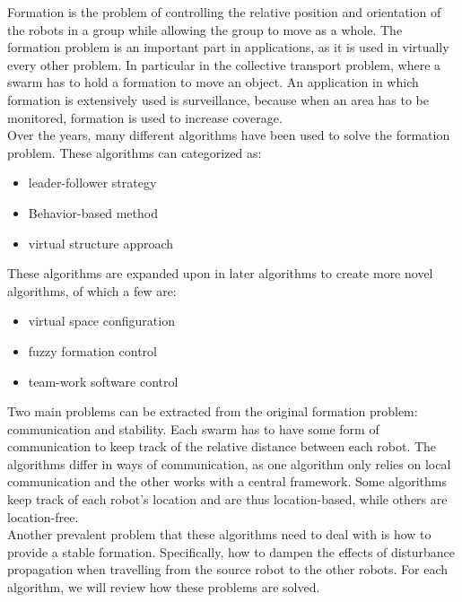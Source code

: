 
Formation is the problem of controlling the relative position and orientation of the robots in a group while allowing the group to move as a whole. \cite{consolini}
The formation problem is an important part in applications, as it is used in virtually every other problem. 
In particular in the collective transport problem, where a swarm has to hold a formation to move an object. 
An application in which formation is extensively used is surveillance, because when an area has to be monitored, formation is used to increase coverage. \cite{burkle2011} \\

Over the years, many different algorithms have been used to solve the formation problem. \cite{chen2005} \cite{consolini}
These algorithms can categorized as:

\begin{itemize}
	\item leader-follower strategy \cite{consolini2007} \cite{Das}
	\item Behavior-based method \cite{balch1998} \cite{lawton}
	\item virtual structure approach \cite{ren} \cite{Do}
\end{itemize}

These algorithms are expanded upon in later algorithms to create more novel algorithms, of which a few are:

\begin{itemize}
	\item virtual space configuration \cite{Wee}
	\item fuzzy formation control \cite{Ranjbar-Sahraei}
	\item team-work software control \cite{Kaminka}
\end{itemize}

Two main problems can be extracted from the original formation problem: communication and stability. 
Each swarm has to have some form of communication to keep track of the relative distance between each robot. 
The algorithms differ in ways of communication, as one algorithm only relies on local communication and the other works with a central framework.
Some algorithms keep track of each robot's location and are thus location-based, while others are location-free. \\

Another prevalent problem that these algorithms need to deal with is how to provide a stable formation. 
Specifically, how to dampen the effects of disturbance propagation when travelling from the source robot to the other robots. 
For each algorithm, we will review how these problems are solved. \\

